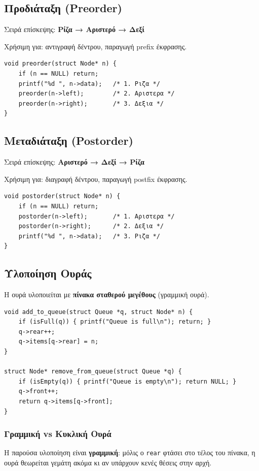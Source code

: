 \documentclass[a4paper,12pt]{article}
\begin{document}
	\subsection{Προδιάταξη (Preorder)}
	Σειρά επίσκεψης: \textbf{Ρίζα → Αριστερό → Δεξί}
	
	Χρήσιμη για: αντιγραφή δέντρου, παραγωγή prefix έκφρασης.
	
	\begin{lstlisting}
void preorder(struct Node* n) {
	if (n == NULL) return;
	printf("%d ", n->data);   /* 1. Ριζα */
	preorder(n->left);        /* 2. Αριστερα */
	preorder(n->right);       /* 3. Δεξια */
}
	\end{lstlisting}
	
	\subsection{Μεταδιάταξη (Postorder)}
	Σειρά επίσκεψης: \textbf{Αριστερό → Δεξί → Ρίζα}
	
	Χρήσιμη για: διαγραφή δέντρου, παραγωγή postfix έκφρασης.
	
	\begin{lstlisting}
void postorder(struct Node* n) {
	if (n == NULL) return;
	postorder(n->left);       /* 1. Αριστερα */
	postorder(n->right);      /* 2. Δεξια */
	printf("%d ", n->data);   /* 3. Ριζα */
}
	\end{lstlisting}
	
	\subsection{Υλοποίηση Ουράς}
	Η ουρά υλοποιείται με \textbf{πίνακα σταθερού μεγέθους} (γραμμική ουρά).
	
	\begin{lstlisting}
void add_to_queue(struct Queue *q, struct Node* n) {
	if (isFull(q)) { printf("Queue is full\n"); return; }
	q->rear++;
	q->items[q->rear] = n;
}

struct Node* remove_from_queue(struct Queue *q) {
	if (isEmpty(q)) { printf("Queue is empty\n"); return NULL; }
	q->front++;
	return q->items[q->front];
}
	\end{lstlisting}
	
	\subsubsection{Γραμμική vs Κυκλική Ουρά}
	Η παρούσα υλοποίηση είναι \textbf{γραμμική}: μόλις ο \texttt{rear} φτάσει 
	στο τέλος του πίνακα, η ουρά θεωρείται γεμάτη ακόμα κι αν υπάρχουν κενές 
	θέσεις στην αρχή.
	
\end{document}
